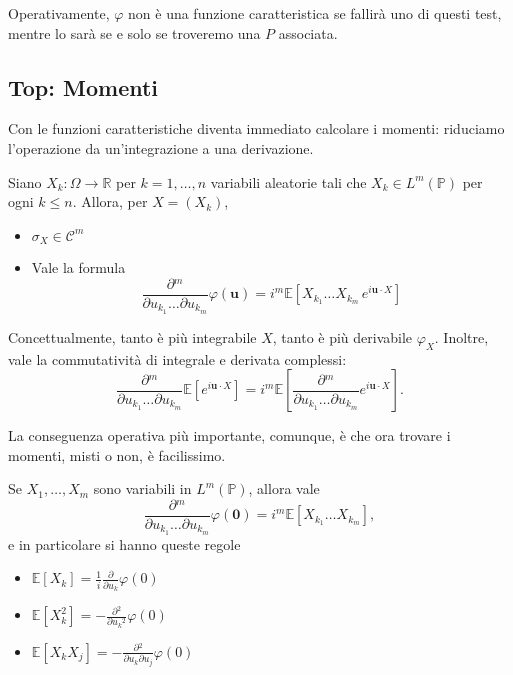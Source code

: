 Operativamente, $\varphi$ non è una funzione caratteristica se fallirà uno di questi test, mentre lo sarà se e solo se troveremo una $P$ associata.

\subsection{Top: Momenti}
Con le funzioni caratteristiche diventa immediato calcolare i momenti: riduciamo l'operazione da un'integrazione a una derivazione.

\begin{my_theorem}
	Siano $X_k:\Omega\to\mathbb{R}$ per $k = 1,\dots,n$ variabili aleatorie tali che $X_k \in L^m (\mathbb{P})$ per ogni $k \leq n$. Allora, per $X=(X_k)$,
	\begin{itemize}
		\item $\sigma_X \in \mathcal{C}^m$
		\item Vale la formula 
			\[
				\frac{\partial{}^m}{\partial{u_{k_1}}\dots\partial{u_{k_m}}} \varphi (\mathbf{u}) = i^m \mathbb{E}\left[X_{k_1} \dots X_{k_m} \, e^{i \mathbf{u}\cdot X}\right]
			\]
	\end{itemize}
\end{my_theorem}

Concettualmente, tanto è più integrabile $X$, tanto è più derivabile $\varphi_X$. 
Inoltre, vale la commutatività di integrale e derivata complessi:
\[
	\frac{\partial{}^m}{\partial{u_{k_1}}\dots\partial{u_{k_m}}} \mathbb{E}\left[e^{i \mathbf{u}\cdot X}\right] = i^m \mathbb{E}\left[\frac{\partial{}^m}{\partial{u_{k_1}}\dots\partial{u_{k_m}}}e^{i \mathbf{u}\cdot X}\right].
\]

La conseguenza operativa più importante, comunque, è che ora trovare i momenti, misti o non, è facilissimo.

\begin{my_corollary}
	Se $X_1,\dots,X_m$ sono variabili in $L^m(\mathbb{P})$, allora vale
	\[
		\frac{\partial{}^m}{\partial{u_{k_1}}\dots\partial{u_{k_m}}} \varphi (\mathbf{0}) = i^m \mathbb{E}\left[X_{k_1} \dots X_{k_m}\right],
	\]
	e in particolare si hanno queste regole
	\begin{itemize}
		\item $\mathbb{E}[X_k] = \frac{1}{i} \frac{\partial{}}{\partial{u_k}}\varphi(0)$
		\item $\mathbb{E}[X_k^2] = - \frac{\partial{}^2}{\partial{u_k}^2}\varphi(0)$
		\item $\mathbb{E}[X_k X_j] = - \frac{\partial{}^2}{\partial{u_k}\partial{u_j}}\varphi(0)$
	\end{itemize}	
\end{my_corollary}

